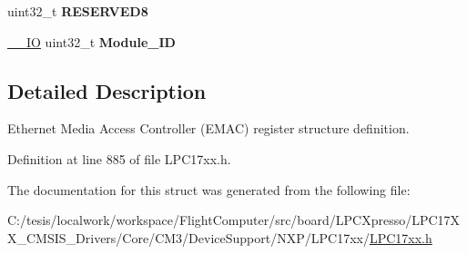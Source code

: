 \begin{DoxyCompactItemize}
\item 
\hypertarget{struct_l_p_c___e_m_a_c___type_def_aed02e29f91e849b6a7d56697228a93c2}{uint32\-\_\-t {\bfseries \-R\-E\-S\-E\-R\-V\-E\-D8}}\label{struct_l_p_c___e_m_a_c___type_def_aed02e29f91e849b6a7d56697228a93c2}

\item 
\hypertarget{struct_l_p_c___e_m_a_c___type_def_a6ae4eea16f2d300e30ea89eb6f780ca5}{\hyperlink{group___c_m_s_i_s__core__definitions_gaec43007d9998a0a0e01faede4133d6be}{\-\_\-\-\_\-\-I\-O} uint32\-\_\-t {\bfseries \-Module\-\_\-\-I\-D}}\label{struct_l_p_c___e_m_a_c___type_def_a6ae4eea16f2d300e30ea89eb6f780ca5}

\end{DoxyCompactItemize}


\subsection{\-Detailed \-Description}
\-Ethernet \-Media \-Access \-Controller (\-E\-M\-A\-C) register structure definition. 

\-Definition at line 885 of file \-L\-P\-C17xx.\-h.



\-The documentation for this struct was generated from the following file\-:\begin{DoxyCompactItemize}
\item 
\-C\-:/tesis/localwork/workspace/\-Flight\-Computer/src/board/\-L\-P\-C\-Xpresso/\-L\-P\-C17\-X\-X\-\_\-\-C\-M\-S\-I\-S\-\_\-\-Drivers/\-Core/\-C\-M3/\-Device\-Support/\-N\-X\-P/\-L\-P\-C17xx/\hyperlink{_l_p_c17xx_8h}{\-L\-P\-C17xx.\-h}\end{DoxyCompactItemize}
